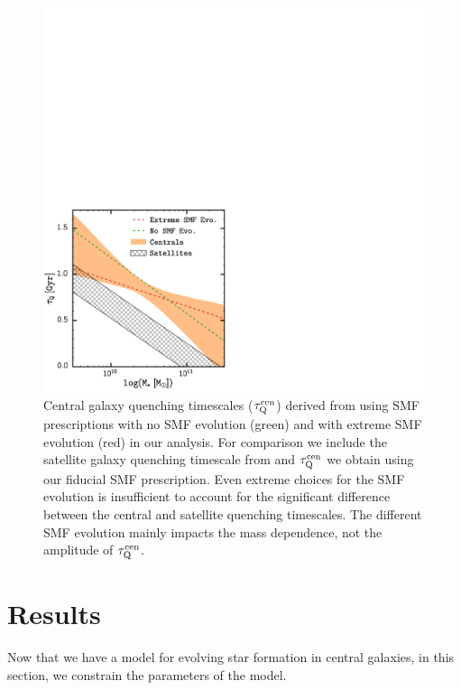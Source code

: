 \begin{figure}
\begin{center}
\includegraphics[width=\textwidth]{figs/cenq/tau_SMFevolcomparison.pdf}
\caption{Central galaxy quenching timescales ($\tau_\mathrm{Q}^\mathrm{cen}$) derived from using 
SMF prescriptions with no SMF evolution (green) and with extreme SMF evolution 
(red) in our analysis. For comparison we include the satellite galaxy quenching 
timescale from \cite{Wetzel:2013aa} and $\tau_\mathrm{Q}^\mathrm{cen}$ we obtain using our fiducial 
SMF prescription. Even extreme choices for the SMF evolution is insufficient to 
account for the significant difference between the central and satellite 
quenching timescales. The different SMF evolution mainly impacts the mass 
dependence, not the amplitude of $\tau_\mathrm{Q}^\mathrm{cen}$.}
\label{fig:tau_smfevol}
\end{center}
\end{figure}

\section{Results} \label{sec:resultss}
Now that we have a model for evolving star formation in central 
galaxies, in this section, we constrain the parameters of the 
model.

